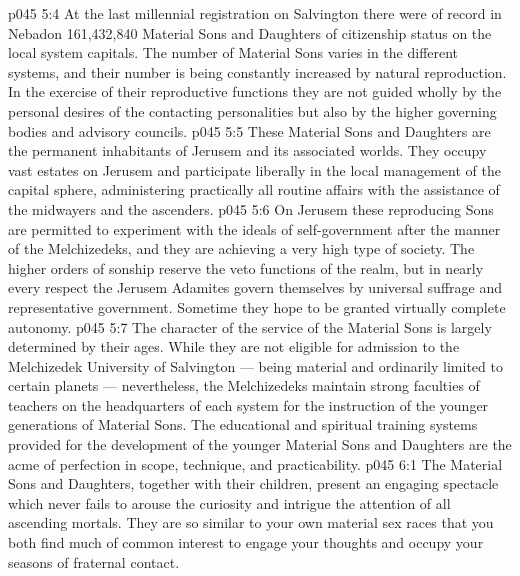 \vs p045 5:4 \pc At the last millennial registration on Salvington there were of record in Nebadon 161,432,840 Material Sons and Daughters of citizenship status on the local system capitals. The number of Material Sons varies in the different systems, and their number is being constantly increased by natural reproduction. In the exercise of their reproductive functions they are not guided wholly by the personal desires of the contacting personalities but also by the higher governing bodies and advisory councils.
\vs p045 5:5 \pc These Material Sons and Daughters are the permanent inhabitants of Jerusem and its associated worlds. They occupy vast estates on Jerusem and participate liberally in the local management of the capital sphere, administering practically all routine affairs with the assistance of the midwayers and the ascenders.
\vs p045 5:6 On Jerusem these reproducing Sons are permitted to experiment with the ideals of self\hyp{}government after the manner of the Melchizedeks, and they are achieving a very high type of society. The higher orders of sonship reserve the veto functions of the realm, but in nearly every respect the Jerusem Adamites govern themselves by universal suffrage and representative government. Sometime they hope to be granted virtually complete autonomy.
\vs p045 5:7 The character of the service of the Material Sons is largely determined by their ages. While they are not eligible for admission to the Melchizedek University of Salvington --- being material and ordinarily limited to certain planets --- nevertheless, the Melchizedeks maintain strong faculties of teachers on the headquarters of each system for the instruction of the younger generations of Material Sons. The educational and spiritual training systems provided for the development of the younger Material Sons and Daughters are the acme of perfection in scope, technique, and practicability.
\vs p045 6:1 The Material Sons and Daughters, together with their children, present an engaging spectacle which never fails to arouse the curiosity and intrigue the attention of all ascending mortals. They are so similar to your own material sex races that you both find much of common interest to engage your thoughts and occupy your seasons of fraternal contact.
